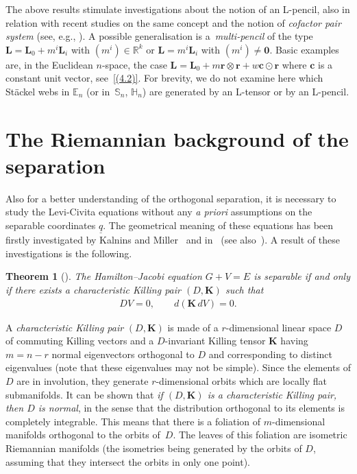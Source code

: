 \documentclass[10pt,a4paper]{amsart}
\def\bs{\boldsymbol}
\numberwithin{equation}{section}
\newtheorem{Theorem}{Theorem}[section]
 { \theoremstyle{definition}
\newtheorem{Notation}[Theorem]{Notation}
\newtheorem{Example}[Theorem]{Example}
\newtheorem{Remark}[Theorem]{Remark}
\newtheorem{Remarks}[Theorem]{Remarks}
 }
\begin{document}
The above results stimulate investigations about the notion of an L-pencil, also in relation with recent studies on the same concept and the notion of {\it cofactor pair system} (see, e.g., \cite{Lundmark-2001, Marciniak-Blaszak-2002, Rauch-Wojciechowski-Marciniak-Lundmark-1999,
Rauch-Wojciechowski-Waksjo-2003}). A possible generalisation is a~{\it multi-pencil} of the type $\bs L=\bs L_0+m^i\bs L_i$ with $(m^i)\in \mathbb R^k$ or $\bs L=m^i\bs L_i$ with $(m^i)\neq \bs 0$. Basic examples are, in the Euclidean $n$-space, the case $\bs L=\bs L_0+ m  \bs r\otimes\bs r+ w \bs c\odot \bs r$ where $\bs c$ is a constant unit vector, see~\eqref{(4.2)}.
For brevity, we do not examine here which St\"ackel webs in $\mathbb E_n$ (or in~$\mathbb S_n$, $\mathbb H_n$) are generated by an L-tensor or by an L-pencil.



\section{The Riemannian background of the separation}\label{section12}

Also for a better understanding of the orthogonal separation, it is necessary to study the Levi-Civita equations without any {\it a priori} assumptions on the separable coordinates $\underline q$. The geometrical meaning of these equations has been f\/irstly investigated by Kalnins and Miller~\cite{KM-1980,KM-1981} and in~\cite{Benenti-1980} (see also~\cite{Benenti-1991,Benenti-1996}). A result of these investigations is the following.

\begin{Theorem}[\cite{Benenti-1997}]\label{t:12.1}
The Hamilton--Jacobi equation $G+V=E$ is separable if and only if there exists a characteristic Killing pair $(D,\bs K)$ such that
\begin{gather}
DV=0, \qquad d(\bs K \,dV)=0.
\label{(12.1)}
\end{gather}
\end{Theorem}

A {\it characteristic Killing pair} $(D,\bs K)$ is made of a $r$-dimensional linear space $D$ of commuting Killing vectors and a $D$-invariant Killing tensor $\bs K$ having $m=n-r$ normal eigenvectors orthogonal to $D$ and corresponding to distinct eigenvalues (note that these eigenvalues may not be simple). Since the elements of $D$ are in involution, they generate $r$-dimensional orbits which are locally f\/lat submanifolds. It can be shown that {\it if $(D,\bs K)$ is a characteristic Killing pair, then $D$ is normal}, in the sense that the distribution orthogonal to its elements is completely integrable. This means that there is a foliation of $m$-dimensional manifolds orthogonal to the orbits of~$D$. The leaves of this foliation are isometric Riemannian manifolds (the isometries being generated by the orbits of $D$, assuming that they intersect the orbits in only one point).
\end{document}
